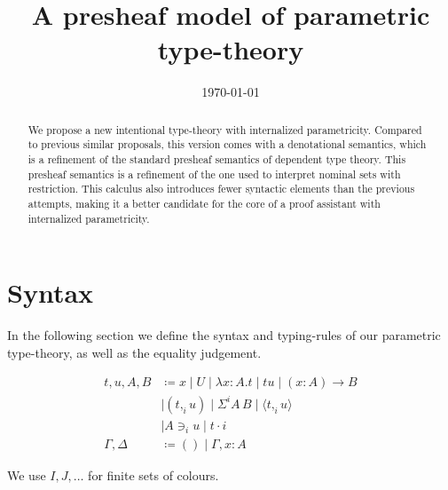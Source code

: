 \documentclass[english]{PaperTools/latex/lipics}
\title{A presheaf model of parametric type-theory}
\author{}
\date{\today}
\newcommand\CP[3]{(#2,_{#1} #3)}
\newcommand\param[1]{\!\cdot\!#1}
\newcommand\op[1]{∋_{#1}}
\newcommand\ip[3]{Σ^{#1} {#2}\,{#3}}
\newcommand\fp[3]{⟨#2 ,_{#1} #3⟩}
\begin{document}
\maketitle

\begin{abstract}
  We propose a new intentional type-theory with internalized
  parametricity. Compared to previous similar proposals, this version
  comes with a denotational semantics, which is a refinement of the
  standard presheaf semantics of dependent type theory. This presheaf
  semantics is a refinement of the one used to interpret nominal sets
  with restriction.
  This calculus also introduces fewer syntactic elements than the
  previous attempts, making it a better candidate for the core of a
  proof assistant with internalized parametricity.
\end{abstract}

\section{Syntax}
In the following section we define the syntax and typing-rules of our
parametric type-theory, as well as the equality judgement.

\begin{definition}
  \begin{align*}
    t,u,A,B & \coloneqq x \mid U \mid λx:A. t      \mid t u \mid (x:A) → B \\
            & \mid \CP i t u  \mid \ip i A B  \mid \fp i t u \\
            & \mid A \op i u \mid t \param i  \\
    \Gamma,\Delta & \coloneqq () \mid \Gamma,x:A
  \end{align*}
\end{definition}

We use $I,J,…$ for finite sets of colours.
\end{document}

